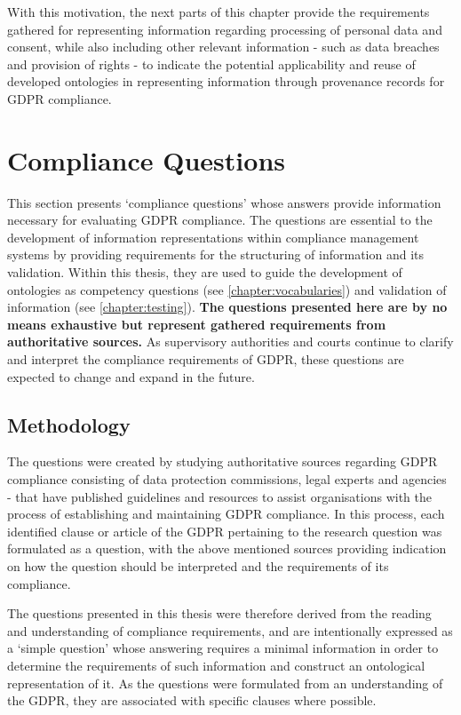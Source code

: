 With this motivation, the next parts of this chapter provide the requirements gathered for representing information regarding processing of personal data and consent, while also including other relevant information - such as data breaches and provision of rights - to indicate the potential applicability and reuse of developed ontologies in representing information through provenance records for GDPR compliance.

\section{Compliance Questions}\label{sec:info:compliance-questions}
This section presents `compliance questions' whose answers provide information necessary for evaluating GDPR compliance. The questions are essential to the development of information representations within compliance management systems by providing requirements for the structuring of information and its validation. Within this thesis, they are used to guide the development of ontologies as competency questions (see \autoref{chapter:vocabularies}) and validation of information (see \autoref{chapter:testing}). \textbf{The questions presented here are by no means exhaustive but represent gathered requirements from authoritative sources.} As supervisory authorities and courts continue to clarify and interpret the compliance requirements of GDPR, these questions are expected to change and expand in the future.

\subsection{Methodology}\label{sec:info:compliance-questions-methodology}
The questions were created by studying authoritative sources regarding GDPR compliance  consisting of data protection commissions, legal experts and agencies - that have published guidelines and resources to assist organisations with the process of establishing and maintaining GDPR compliance.
In this process, each identified clause or article of the GDPR pertaining to the research question was formulated as a question, with the above mentioned sources providing indication on how the question should be interpreted and the requirements of its compliance.

The questions presented in this thesis were therefore derived from the reading and understanding of compliance requirements, and are intentionally expressed as a `simple question' whose answering requires a minimal information in order to determine the requirements of such information and construct an ontological representation of it.
As the questions were formulated from an understanding of the GDPR, they are associated with specific clauses where possible.

